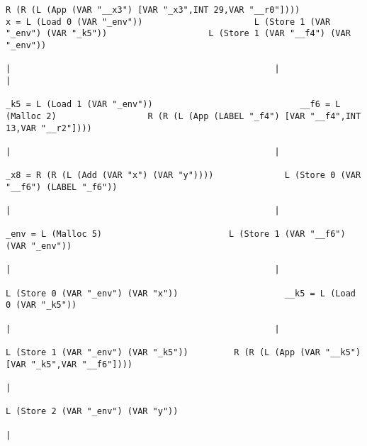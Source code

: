 \begin{landscape}
\begin{lstlisting}[basicstyle=\fontsize{5.5}{6.5}\selectfont\ttfamily]
                                    R (R (L (App (VAR "__x3") [VAR "_x3",INT 29,VAR "__r0"])))             x = L (Load 0 (VAR "_env"))                      L (Store 1 (VAR "_env") (VAR "_k5"))                    L (Store 1 (VAR "__f4") (VAR "_env"))
                                                                                                                        |                                                    |                                                        |
                                                                                                          _k5 = L (Load 1 (VAR "_env"))                             __f6 = L (Malloc 2)                  R (R (L (App (LABEL "_f4") [VAR "__f4",INT 13,VAR "__r2"])))
                                                                                                                        |                                                    |
                                                                                                    _x8 = R (R (L (Add (VAR "x") (VAR "y"))))              L (Store 0 (VAR "__f6") (LABEL "_f6"))
                                                                                                                        |                                                    |
                                                                                                               _env = L (Malloc 5)                         L (Store 1 (VAR "__f6") (VAR "_env"))
                                                                                                                        |                                                    |
                                                                                                        L (Store 0 (VAR "_env") (VAR "x"))                     __k5 = L (Load 0 (VAR "_k5"))
                                                                                                                        |                                                    |
                                                                                                       L (Store 1 (VAR "_env") (VAR "_k5"))         R (R (L (App (VAR "__k5") [VAR "_k5",VAR "__f6"])))
                                                                                                                        |
                                                                                                        L (Store 2 (VAR "_env") (VAR "y"))
                                                                                                                        |

\end{lstlisting}
\end{landscape}
